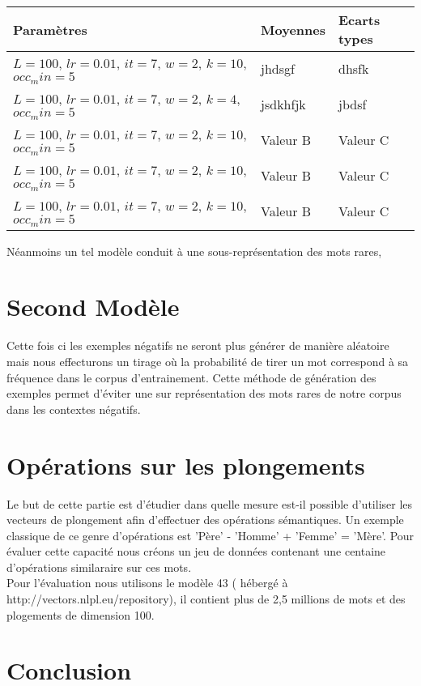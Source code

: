 \documentclass[12pt]{article}
\begin{document}
\begin{tabularx}{\textwidth}{|X|X|X|}
    \hline
    Paramètres & Moyennes & Ecarts types \\ 
    \hline
    $L=100$, $lr=0.01$,  $it=7$, $w=2$, $k=10$, $occ_min=5$  & jhdsgf  & dhsfk  \\ 
    \hline
    $L=100$, $lr=0.01$,  $it=7$, $w=2$, $k=4$, $occ_min=5$  & jsdkhfjk  & jbdsf  \\ 
    \hline
    $L=100$, $lr=0.01$,  $it=7$, $w=2$, $k=10$, $occ_min=5$  & Valeur B  & Valeur C  \\ 
    \hline
    $L=100$, $lr=0.01$,  $it=7$, $w=2$, $k=10$, $occ_min=5$  & Valeur B  & Valeur C  \\ 
    \hline
    $L=100$, $lr=0.01$,  $it=7$, $w=2$, $k=10$, $occ_min=5$  & Valeur B  & Valeur C  \\ 
    \hline
    \end{tabularx}
Néanmoins un tel modèle conduit à une sous-représentation des mots rares, 

\section{Second Modèle}

Cette fois ci les exemples négatifs ne seront plus générer de manière aléatoire mais nous effecturons 
un tirage où la probabilité de tirer un mot correspond à sa fréquence dans le corpus d'entrainement.
Cette méthode de génération des exemples permet d'éviter une sur représentation des mots rares de notre 
corpus dans les contextes négatifs.

\section{Opérations sur les plongements} 

Le but de cette partie est d'étudier dans quelle mesure est-il possible d'utiliser les vecteurs
de plongement afin d'effectuer des opérations sémantiques. Un exemple classique de ce genre d'opérations est
'Père' - 'Homme' + 'Femme' = 'Mère'. Pour évaluer cette capacité nous créons un jeu de données contenant une 
centaine d'opérations similaraire sur ces mots. \\
Pour l'évaluation nous utilisons le modèle 43 ( hébergé à http://vectors.nlpl.eu/repository), il contient 
plus de 2,5 millions de mots et des plogements de dimension 100.  


\section{Conclusion}
\end{document}
